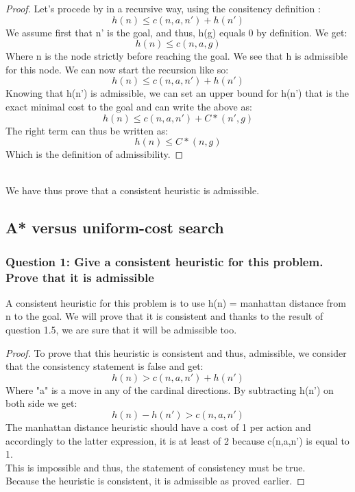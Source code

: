 \documentclass[a4paper,10pt]{article}
\begin{document}
				\begin{proof}
					Let's procede by in a recursive way, using the consitency definition :						$$ h(n) \leq c(n,a,n') + h(n') $$
					We assume first that n' is the goal, and thus, h(g) equals 0 by definition. We get:
					$$ h(n) \leq c(n,a,g) $$
					Where n is the node strictly before reaching the goal. We see that h is admissible for this node. We can now start the recursion like so:
					$$ h(n) \leq c(n,a,n') + h(n') $$
					Knowing that h(n') is admissible, we can set an upper bound for h(n') that is the exact minimal cost to the goal and can write the above as:
					$$ h(n) \leq c(n,a,n') + C*(n', g) $$
					The right term can thus be written as:
					$$ h(n) \leq C*(n, g) $$
					Which is the definition of admissibility.        
				\end{proof}\\
				We have thus prove that a consistent heuristic is admissible.
				
		\subsection{A* versus uniform-cost search}
			\subsubsection{Question 1: Give a consistent heuristic for this problem. Prove that it is admissible}
				A consistent heuristic for this problem is to use h(n) = manhattan distance from n to the goal. We will prove that it is consistent and thanks to the result of question 1.5, we are sure that it will be admissible too.
				\begin{proof}
					To prove that this heuristic is consistent and thus, admissible, we consider that the consistency statement is false and get:
					$$ h(n) > c(n,a,n') + h(n') $$
					Where "a" is a move in any of the cardinal directions.
					By subtracting h(n') on both side we get:
					$$ h(n) - h(n') > c(n,a,n') $$
					The manhattan distance heuristic should have a cost of 1 per action and accordingly to the latter expression, it is at least of 2 because c(n,a,n') is equal to 1.\\
					This is impossible and thus, the statement of consistency must be true.\\
					Because the heuristic is consistent, it is admissible as proved earlier.   
				\end{proof}  				
				
\end{document}
